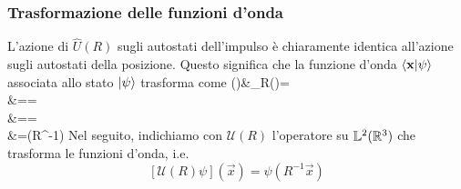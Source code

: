 \documentclass[a4paper, 11pt]{article}
\newcommand{\op}{\hat}
\def\bal#1\eal{\begin{align*}#1\end{align*}}
\newcommand{\1}{\mathbbm{1}}
\begin{document}
	\subsubsection{Trasformazione delle funzioni d'onda}
	L'azione di $\op U(R)$ sugli autostati dell'impulso è chiaramente identica all'azione sugli autostati della posizione. Questo significa che la funzione d'onda $\langle \mathbf{x}\vert\psi\rangle$ associata allo stato $\left| \psi\right\rangle$ trasforma come
	\bal
	\psi()&\mapsto\psi_R()=\\&=\braketop{\vec{x}}{\op U(R)}{\psi}=\\&==\\&=\psi(R^{-1}) 
	\eal
	Nel seguito, indichiamo con $\mathcal{U}(R)$ l'operatore su $\mathbb L^2(\mathbb{R} ^3)$ che trasforma le funzioni d'onda, i.e.
	\[[\mathcal{U}(R)\psi](\vec{x})=\psi(R^{-1}\vec{x})\]
\end{document}
